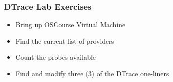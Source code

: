 \documentclass[pdftex,handout]{beamer}
\begin{document}
\begin{frame}[fragile]
  \frametitle{DTrace Lab Exercises}
  \begin{itemize}
  \item Bring up OSCourse Virtual Machine
  \item Find the current list of providers
  \item Count the probes available
  \item Find and modify three (3) of the DTrace one-liners
  \end{itemize}
\end{frame}
\end{document}
